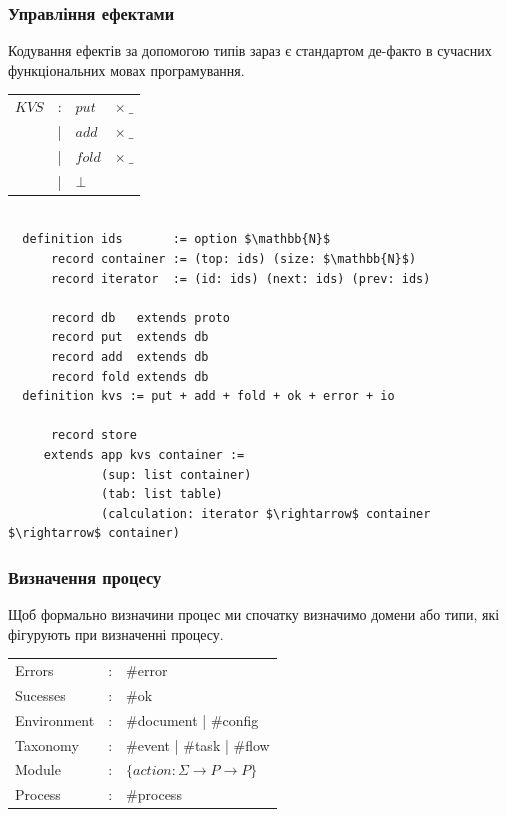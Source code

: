\documentclass[11pt,oneside]{article}
\begin{document}
  \subsubsection*{Управління ефектами}

   Кодування ефектів за допомогою типів зараз є стандартом
   де-факто в сучасних функціональних мовах програмування.

\begin{center}
\begin{tabular}{llll}
$KVS$     &:& $put$     & $\times\ \_$          \\
          &|& $add$     & $\times\ \_$          \\
          &|& $fold$    & $\times\ \_$         \\
          &|& $\bot$    & \\
\end{tabular}
\end{center}

\begin{center}
\begin{lstlisting}[mathescape=true]

  definition ids       := option $\mathbb{N}$
      record container := (top: ids) (size: $\mathbb{N}$)
      record iterator  := (id: ids) (next: ids) (prev: ids)

      record db   extends proto
      record put  extends db
      record add  extends db
      record fold extends db
  definition kvs := put + add + fold + ok + error + io

      record store
     extends app kvs container :=
             (sup: list container)
             (tab: list table)
             (calculation: iterator $\rightarrow$ container $\rightarrow$ container)

\end{lstlisting}
\end{center}

\newpage
   \subsubsection*{Визначення процесу}

   Щоб формально визначини процес ми спочатку визначимо домени або типи,
   які фігурують при визначенні процесу.

\begin{center}
\begin{tabular}{lcl}
                Errors &:& \#error\\
              Sucesses &:& \#ok \\
           Environment &:& \#document | \#config\\
              Taxonomy &:& \#event    | \#task   | \#flow\\
                Module &:& $\{ action : \Sigma \rightarrow P \rightarrow P \}$ \\ \hline
               Process &:& \#process\\
\end{tabular}
\end{center}
\end{document}
